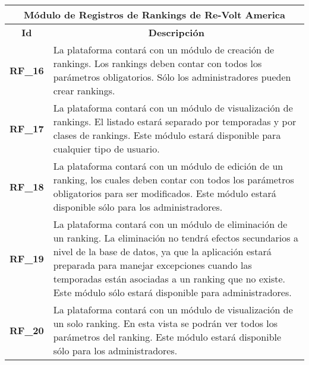 \begin{center}
	\begin{tabular}{ | l | p{15cm} |}
		\hline
		\multicolumn{2}{|c|}{\textbf{Módulo de Registros de Rankings de Re-Volt America}} \\
		\hline
		\multicolumn{1}{|c|}{\textbf{Id}} & \multicolumn{1}{|c|}{\textbf{Descripción}} \\
		\hline
		{\textbf{RF\_16}} & La plataforma contará con un módulo de creación de rankings. Los rankings deben contar con todos los parámetros obligatorios. Sólo los administradores pueden crear rankings. \\ \hline
		
		{\textbf{RF\_17}} & La plataforma contará con un módulo de visualización de rankings. El listado estará separado por temporadas y por clases de rankings. Este módulo estará disponible para cualquier tipo de usuario. \\ \hline
		
		{\textbf{RF\_18}} & La plataforma contará con un módulo de edición de un ranking, los cuales deben contar con todos los parámetros obligatorios para ser modificados. Este módulo estará disponible sólo para los administradores. \\ \hline
		
		{\textbf{RF\_19}} & La plataforma contará con un módulo de eliminación de un ranking. La eliminación no tendrá efectos secundarios a nivel de la base de datos, ya que la aplicación estará preparada para manejar excepciones cuando las temporadas están asociadas a un ranking que no existe. Este módulo sólo estará disponible para administradores. \\ \hline
		
		{\textbf{RF\_20}} & La plataforma contará con un módulo de visualización de un solo ranking. En esta vista se podrán ver todos los parámetros del ranking. Este módulo estará disponible sólo para los administradores. \\ \hline
	\end{tabular}
\end{center}


